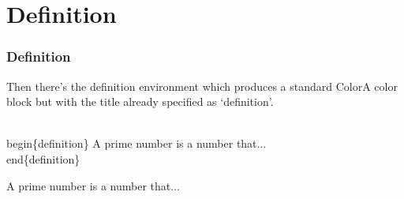 \section{Definition}
\label{definition}
\begin{frame}\frametitle{Definition}
  Then there’s the definition environment which produces a standard ColorA color block but with the title already specified as ‘definition’.
  \begin{semiverbatim}
    \\begin\{definition\}\newline
    A prime number is a number that...\newline
    \\end\{definition\}
  \end{semiverbatim}
  \begin{definition}
    A prime number is a number that...
  \end{definition}
\end{frame}